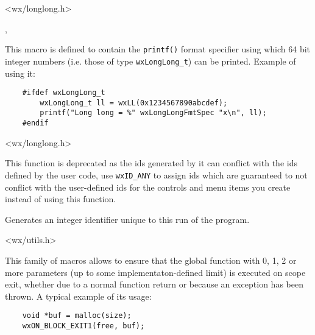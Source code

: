 
<wx/longlong.h>


, 


\label{wxlonglongfmtspec}

This macro is defined to contain the {\tt printf()} format specifier using
which 64 bit integer numbers (i.e. those of type {\tt wxLongLong\_t}) can be
printed. Example of using it:

\begin{verbatim}
    #ifdef wxLongLong_t
        wxLongLong_t ll = wxLL(0x1234567890abcdef);
        printf("Long long = %" wxLongLongFmtSpec "x\n", ll);
    #endif
\end{verbatim}




<wx/longlong.h>


\label{wxnewid}


This function is deprecated as the ids generated by it can conflict with the
ids defined by the user code, use \texttt{wxID\_ANY} to assign ids which are
guaranteed to not conflict with the user-defined ids for the controls and menu
items you create instead of using this function.


Generates an integer identifier unique to this run of the program.


<wx/utils.h>


\label{wxonblockexit}




This family of macros allows to ensure that the global function 
with 0, 1, 2 or more parameters (up to some implementaton-defined limit) is
executed on scope exit, whether due to a normal function return or because an
exception has been thrown. A typical example of its usage:
\begin{verbatim}
    void *buf = malloc(size);
    wxON_BLOCK_EXIT1(free, buf);
\end{verbatim}

